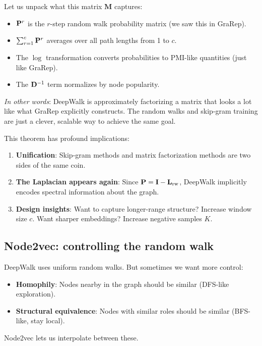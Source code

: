 \begin{notechapter}
\begin{intuition}
Let us unpack what this matrix $\mathbf{M}$ captures:

\begin{itemize}
    \item $\mathbf{P}^r$ is the $r$-step random walk probability matrix (we saw this in GraRep).
    \item $\sum_{r=1}^{c} \mathbf{P}^r$ averages over all path lengths from 1 to $c$.
    \item The $\log$ transformation converts probabilities to PMI-like quantities (just like GraRep).
    \item The $\mathbf{D}^{-1}$ term normalizes by node popularity.
\end{itemize}

\emph{In other words}: DeepWalk is approximately factorizing a matrix that looks a lot like what GraRep explicitly constructs. The random walks and skip-gram training are just a clever, scalable way to achieve the same goal.
\end{intuition}

\begin{keyidea}
This theorem has profound implications:

\begin{enumerate}
    \item \textbf{Unification}: Skip-gram methods and matrix factorization methods are two sides of the same coin.
    \item \textbf{The Laplacian appears again}: Since $\mathbf{P} = \mathbf{I} - \mathbf{L}_{\text{rw}}$, DeepWalk implicitly encodes spectral information about the graph.
    \item \textbf{Design insights}: Want to capture longer-range structure? Increase window size $c$. Want sharper embeddings? Increase negative samples $K$.
\end{enumerate}
\end{keyidea}

\subsection{Node2vec: controlling the random walk}

\begin{intuition}[Motivation]
DeepWalk uses uniform random walks. But sometimes we want more control:
\begin{itemize}
    \item \textbf{Homophily}: Nodes nearby in the graph should be similar (DFS-like exploration).
    \item \textbf{Structural equivalence}: Nodes with similar roles should be similar (BFS-like, stay local).
\end{itemize}
Node2vec lets us interpolate between these.
\end{intuition}


\end{notechapter}
